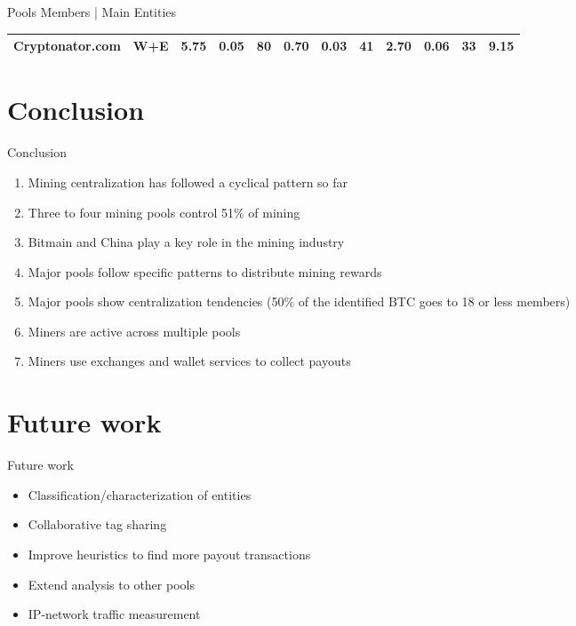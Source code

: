 \documentclass[10pt]{beamer}
\begin{document}
\begin{frame}[fragile]{Pools Members | Main Entities}
\begin{table}
{\begin{tabular}{@{}llrrrrrrrrrr@{}}
            Cryptonator.com     & W+E     & 5.75    & 0.05  & 80          & 0.70    & 0.03  & 41          & 2.70    & 0.06  & 33          & 9.15      \\ 
            \bottomrule
            \end{tabular}
        }
    \end{table} 
\end{frame}

\section{Conclusion} 
\begin{frame}[fragile]{Conclusion}
    \begin{enumerate}
        \item Mining centralization has followed a cyclical pattern so far
        \item Three to four mining pools control 51\% of mining
        \item Bitmain and China play a key role in the mining industry 
        \item Major pools follow specific patterns to distribute mining rewards
        \item Major pools show centralization tendencies (50\% of the identified BTC goes to 18 or less members)
        \item Miners are active across multiple pools
        \item Miners use exchanges and wallet services to collect payouts
    \end{enumerate}
\end{frame}

\section{Future work} 
\begin{frame}[fragile]{Future work}
    \begin{itemize}
        \item Classification/characterization of entities 
        \item Collaborative tag sharing
        \item Improve heuristics to find more payout transactions
        \item Extend analysis to other pools
        \item IP-network traffic measurement
    \end{itemize}
\end{frame}
 
\end{document}
